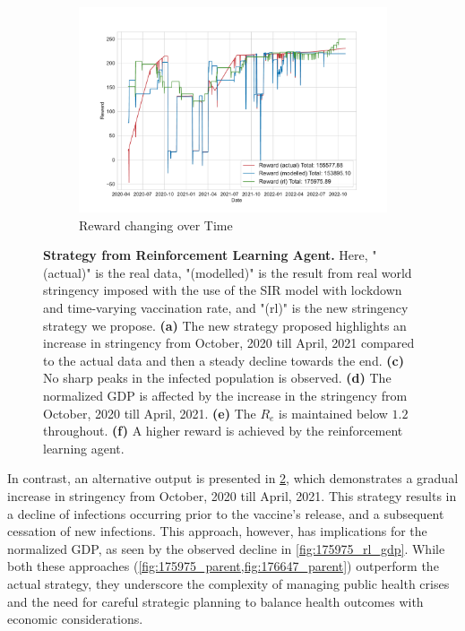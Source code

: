 \documentclass[tikz,fleqn,12pt]{wlscirep}
\begin{document}
\begin{figure}[htbp!]
\begin{subfigure}[t]{0.48\textwidth}
    \includegraphics[width=\linewidth]{images/175975/rl_reward.pdf}
    \caption{Reward changing over Time}
    \label{fig:175975_rl_reward}
  \end{subfigure}
  \caption{\textbf{Strategy from Reinforcement Learning Agent.} Here, "(actual)" is the real data, "(modelled)" is the result from real world stringency imposed with the use of the SIR model with lockdown and time-varying vaccination rate, and "(rl)" is the new stringency strategy we propose. \textbf{(a)} The new strategy proposed highlights an increase in stringency from October, 2020 till April, 2021 compared to the actual data and then a steady decline towards the end. \textbf{(c)} No sharp peaks in the infected population is observed. \textbf{(d)} The normalized GDP is affected by the increase in the stringency from October, 2020 till April, 2021. \textbf{(e)} The $R_e$ is maintained below $1.2$ throughout. \textbf{(f)} A higher reward is achieved by the reinforcement learning agent.}
  \label{fig:175975_parent}
\end{figure}

In contrast, an alternative output is presented in \cref{fig:175975_parent}, which demonstrates a gradual increase in stringency from October, 2020 till April, 2021. This strategy results in a decline of infections occurring prior to the vaccine's release, and a subsequent cessation of new infections. This approach, however, has implications for the normalized GDP, as seen by the observed decline in \cref{fig:175975_rl_gdp}. While both these approaches (\cref{fig:175975_parent,fig:176647_parent}) outperform the actual strategy, they underscore the complexity of managing public health crises and the need for careful strategic planning to balance health outcomes with economic considerations.
\end{document}
